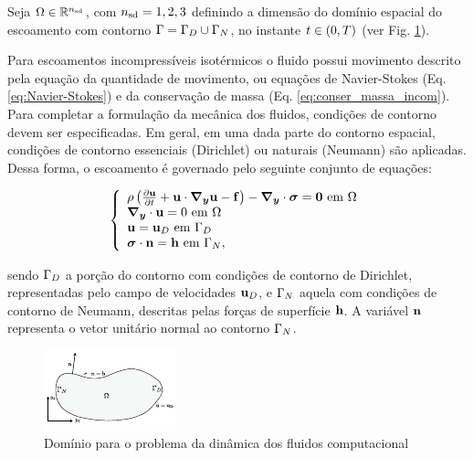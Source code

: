 \documentclass[tese_patricia]{subfiles}%
\begin{document}
Seja $\Omega \in \mathbb{R}^{{n_{\mathrm{sd}}}}$, com ${n_{\mathrm{sd}}} = 1,2,3$ definindo a dimensão do domínio espacial do escoamento com contorno $\Gamma = \Gamma_{D} \cup \Gamma_{N}$, no instante $t \in (0,T)$ (ver Fig. \ref{fig:dominioFluido}).

Para escoamentos incompressíveis isotérmicos o fluido possui movimento descrito pela equação da quantidade de movimento, ou equações de Navier-Stokes (Eq. \ref{eq:Navier-Stokes}) e da conservação de massa (Eq. \ref{eq:conser_massa_incom}). Para completar a formulação da mecânica dos fluidos, condições de contorno devem ser especificadas. Em geral, em uma dada parte do contorno espacial, condições de contorno essenciais (Dirichlet) ou naturais (Neumann) são aplicadas. Dessa forma, o escoamento é governado pelo seguinte conjunto de equações:

\begin{equation}
	\left\{
	\begin{array}{l}
		\density\left(\frac{\partial\velocity}{\partial t} + \velocity\cdot\gradient\velocity - \sbodyforce \right) - \divergence \cdot \stressTensor = \vzero \ \textrm{em} \ \domain\\
		\divergence \cdot \velocity = 0 \ \textrm{em} \ \domain\\
		\velocity = \velocityD \ \textrm{em} \ \boundaryD \\
		\stressTensor \cdot \snormal = \surfaceLoad \ \textrm{em} \ \boundaryN,
	\end{array} \label{eq:conj_eq_DFC}
	\right.
\end{equation}

\noindent sendo $\Gamma_{D}$ a porção do contorno com condições de contorno de Dirichlet, representadas pelo campo de velocidades $\mathbf{u}_D$, e $\Gamma_{N}$ aquela com condições de contorno de Neumann, descritas pelas forças de superfície $\mathbf{h}$. A variável $\mathbf{n}$ representa o vetor unitário normal ao contorno $\Gamma_{N}$.

\begin{figure}[htb!]
	\centering 
	\includegraphics[scale=3.0,trim=0cm 0.0cm 0cm 0.0cm, clip=true]{Imagens/Cap2/dominioFluido.pdf}	
	\caption{Domínio para o problema da dinâmica dos fluidos computacional}
	\label{fig:dominioFluido}
\end{figure}
\end{document}
